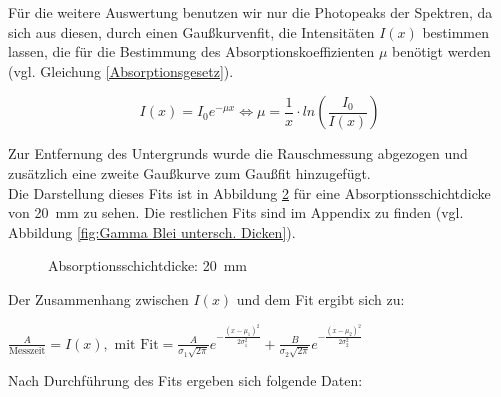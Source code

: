 \begin{figure}[h]
    \centering
    
    \caption{}
    \label{fig:Gesamtspektrum Gamma Blei}
    
\end{figure}

Für die weitere Auswertung benutzen wir nur die Photopeaks der Spektren, da sich aus diesen, durch einen Gaußkurvenfit, die Intensitäten $I(x)$ bestimmen lassen, die für die Bestimmung des Absorptionskoeffizienten $\mu$ benötigt werden (vgl. Gleichung \ref{Absorptionsgesetz}). 

\begin{equation}
    I(x) = I_0e^{-\mu x} \Leftrightarrow \mu = \frac{1}{x} \cdot ln\left(\frac{I_0}{I(x)}\right)
    \label{Absorptionsgesetz}
\end{equation}

Zur Entfernung des Untergrunds wurde die Rauschmessung abgezogen und zusätzlich eine zweite Gaußkurve zum Gaußfit hinzugefügt. \\
Die Darstellung dieses Fits ist in Abbildung \ref{fig:Gamma Blei Dicke 1} für eine Absorptionsschichtdicke von \SI{20}{\mm} zu sehen. Die restlichen Fits sind im Appendix zu finden (vgl. Abbildung \ref{fig:Gamma Blei untersch. Dicken}). \\


\begin{figure}[h]
    \centering
    
    \caption{Absorptionsschichtdicke: \SI{20}{\mm}}
    \label{fig:Gamma Blei Dicke 1}
    
\end{figure}

Der Zusammenhang zwischen $I(x)$ und dem Fit ergibt sich zu: 
\begin{center}
    $ \frac{A}{\text{Messzeit}} = I(x),  \text{ mit} \text{ Fit}=\frac{A}{\sigma_1\sqrt{2\pi}} e^{-\frac{(x - \mu_1)^2}{ 2\sigma_1^2}} + \frac{B}{\sigma_2\sqrt{2\pi}} e^{-\frac{(x - \mu_2)^2}{ 2\sigma_2^2}} $
\end{center} 


Nach Durchführung des Fits ergeben sich folgende Daten: 


